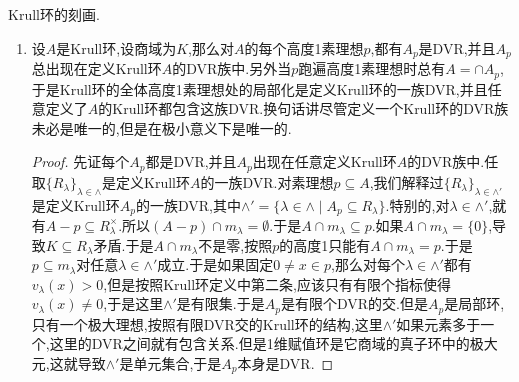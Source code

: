 Krull环的刻画.
\begin{enumerate}
	\item 设$A$是Krull环,设商域为$K$,那么对$A$的每个高度1素理想$p$,都有$A_p$是DVR,并且$A_p$总出现在定义Krull环$A$的DVR族中.另外当$p$跑遍高度1素理想时总有$A=\cap A_p$,于是Krull环的全体高度1素理想处的局部化是定义Krull环的一族DVR,并且任意定义了$A$的Krull环都包含这族DVR.换句话讲尽管定义一个Krull环的DVR族未必是唯一的,但是在极小意义下是唯一的.
	\begin{proof}
		
		先证每个$A_p$都是DVR,并且$A_p$出现在任意定义Krull环$A$的DVR族中.任取$\{R_{\lambda}\}_{\lambda\in\wedge}$是定义Krull环$A$的一族DVR.对素理想$p\subseteq A$,我们解释过$\{R_{\lambda}\}_{\lambda\in\wedge'}$是定义Krull环$A_p$的一族DVR,其中$\wedge'=\{\lambda\in\wedge\mid A_p\subseteq R_{\lambda}\}$.特别的,对$\lambda\in\wedge'$,就有$A-p\subseteq R_{\lambda}^{\times}$.所以$(A-p)\cap m_{\lambda}=\emptyset$.于是$A\cap m_{\lambda}\subseteq p$.如果$A\cap m_{\lambda}=\{0\}$,导致$K\subseteq R_{\lambda}$矛盾.于是$A\cap m_{\lambda}$不是零,按照$p$的高度1只能有$A\cap m_{\lambda}=p$.于是$p\subseteq m_{\lambda}$对任意$\lambda\in\wedge'$成立.于是如果固定$0\not=x\in p$,那么对每个$\lambda\in\wedge'$都有$v_{\lambda}(x)>0$,但是按照Krull环定义中第二条,应该只有有限个指标使得$v_{\lambda}(x)\not=0$,于是这里$\wedge'$是有限集.于是$A_p$是有限个DVR的交.但是$A_p$是局部环,只有一个极大理想,按照有限DVR交的Krull环的结构,这里$\wedge'$如果元素多于一个,这里的DVR之间就有包含关系.但是1维赋值环是它商域的真子环中的极大元,这就导致$\wedge'$是单元集合,于是$A_p$本身是DVR.
		
		\qquad
		

\end{proof}
\end{enumerate}
